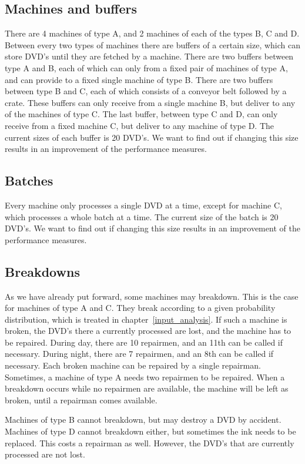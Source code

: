 \documentclass{article}
\begin{document}
\subsection{Machines and buffers}
There are 4 machines of type A, and 2 machines of each of the types B, C and D.
Between every two types of machines there are buffers of a certain size, which can store DVD's until they are fetched by a machine.
There are two buffers between type A and B, each of which can only from a fixed pair of machines of type A, and can provide to a fixed single machine of type B.
There are two buffers between type B and C, each of which consists of a conveyor belt followed by a crate.
These buffers can only receive from a single machine B, but deliver to any of the machines of type C.
The last buffer, between type C and D, can only receive from a fixed machine C, but deliver to any machine of type D.
The current sizes of each buffer is 20 DVD's.
We want to find out if changing this size results in an improvement of the performance measures.

\subsection{Batches}
Every machine only processes a single DVD at a time, except for machine C, which processes a whole batch at a time.
The current size of the batch is 20 DVD's.
We want to find out if changing this size results in an improvement of the performance measures.


\subsection{Breakdowns}
As we have already put forward, some machines may breakdown.
This is the case for machines of type A and C.
They break according to a given probability distribution, which is treated in chapter~\ref{input_analysis}.
If such a machine is broken, the DVD's there a currently processed are lost, and the machine has to be repaired.
During day, there are 10 repairmen, and an 11th can be called if necessary.
During night, there are 7 repairmen, and an 8th can be called if necessary.
Each broken machine can be repaired by a single repairman.
Sometimes, a machine of type A needs two repairmen to be repaired.
When a breakdown occurs while no repairmen are available, the machine will be left as broken, until a repairman comes available.

Machines of type B cannot breakdown, but may destroy a DVD by accident.
Machines of type D cannot breakdown either, but sometimes the ink needs to be replaced.
This costs a repairman as well.
However, the DVD's that are currently processed are not lost.
\end{document}
